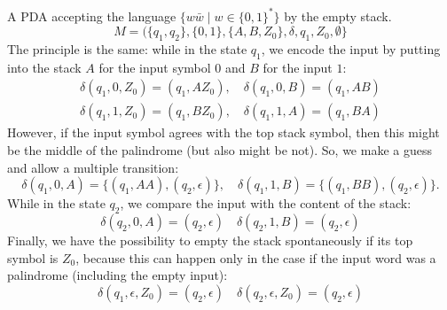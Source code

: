 \begin{exl}
\label{exl:Palindromes}
A PDA accepting the language $\{w \bar{w} \mid w \in \{0,1\}^*\}$ by the empty stack.
\[
M = (\{q_1, q_2\}, \{0, 1\}, \{A, B, Z_0\}, \delta, q_1, Z_0, \emptyset\}
\]
The principle is the same: while in the state $q_1$, we encode the input by putting into the stack $A$ for the input symbol $0$ and $B$ for the input $1$:
\begin{gather*}
\delta(q_1, 0, Z_0) = (q_1, AZ_0), \quad \delta(q_1, 0, B) = (q_1, AB)\\
\delta(q_1, 1, Z_0) = (q_1, BZ_0), \quad \delta(q_1, 1, A) = (q_1, BA)
\end{gather*}
However, if the input symbol agrees with the top stack symbol, then this might be the middle of the palindrome (but also might be not).
So, we make a guess and allow a multiple transition:
\[
\delta(q_1, 0, A) = \{(q_1, AA), (q_2, \epsilon)\}, \quad \delta(q_1, 1, B) = \{(q_1, BB), (q_2, \epsilon)\}.
\]
While in the state $q_2$, we compare the input with the content of the stack:
\[
\delta(q_2, 0, A) = (q_2, \epsilon) \quad \delta(q_2, 1, B) = (q_2, \epsilon)
\]
Finally, we have the possibility to empty the stack spontaneously if its top symbol is $Z_0$,
because this can happen only in the case if the input word was a palindrome (including the empty input):
\[
\delta(q_1, \epsilon, Z_0) = (q_2, \epsilon) \quad \delta(q_2, \epsilon, Z_0) = (q_2, \epsilon)
\]
\end{exl}